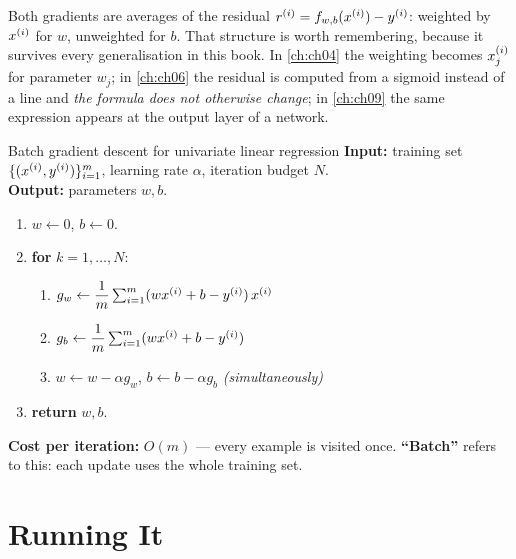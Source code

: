 Both gradients are averages of the residual $r^{(i)} = f_{w,b}(x^{(i)})-y^{(i)}$:
weighted by $x^{(i)}$ for $w$, unweighted for $b$. That structure is worth
remembering, because it survives every generalisation in this book. In
\cref{ch:ch04} the weighting becomes $x^{(i)}_{j}$ for parameter $w_j$; in
\cref{ch:ch06} the residual is computed from a sigmoid instead of a line and
\emph{the formula does not otherwise change}; in \cref{ch:ch09} the same
expression appears at the output layer of a network.

\begin{algorithmbox}{Batch gradient descent for univariate linear regression}
\textbf{Input:} training set $\{(x^{(i)},y^{(i)})\}_{i=1}^m$, learning rate
$\alpha$, iteration budget $N$.\\
\textbf{Output:} parameters $w,b$.

\begin{enumerate}\setlength{\itemsep}{1pt}
  \item $w \leftarrow 0$, \quad $b \leftarrow 0$.
  \item \textbf{for} $k = 1,\dots,N$:
  \begin{enumerate}\setlength{\itemsep}{1pt}
    \item $g_w \leftarrow \dfrac{1}{m}\sum_{i=1}^{m}(wx^{(i)}+b-y^{(i)})\,x^{(i)}$
    \item $g_b \leftarrow \dfrac{1}{m}\sum_{i=1}^{m}(wx^{(i)}+b-y^{(i)})$
    \item $w \leftarrow w - \alpha g_w$, \quad $b \leftarrow b - \alpha g_b$
          \hfill \emph{(simultaneously)}
  \end{enumerate}
  \item \textbf{return} $w, b$.
\end{enumerate}

\textbf{Cost per iteration:} $O(m)$ --- every example is visited once.
\textbf{``Batch''} refers to this: each update uses the whole training set.
\end{algorithmbox}

\section{Running It}
\label{sec:running-gd}

